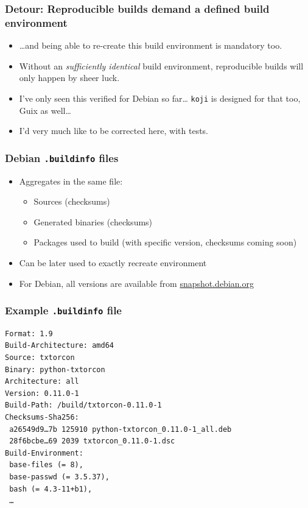 \documentclass[14pt,aspectratio=169]{beamer}
\begin{document}
\begin{frame}
 \frametitle{Detour: Reproducible builds demand a defined build environment}
 \begin{itemize}
  \item …and being able to re-create this build environment is mandatory too.
  \item Without an \textit{sufficiently identical} build environment, reproducible builds will only
  happen by sheer luck.
  \item<2>{I've only seen this verified for Debian so far… \texttt{koji}
  is designed for that too, Guix as well…}
\item<2> {I'd very much like to be corrected here, with tests.}
 \end{itemize}
\end{frame}


\begin{frame}
 \frametitle{Debian \texttt{.buildinfo} files}

 \begin{itemize}
  \item Aggregates in the same file:
   \begin{itemize}
    \item Sources (checksums)
    \item Generated binaries (checksums)
    \item Packages used to build (with specific version, checksums coming soon)
   \end{itemize}
  \item Can be later used to exactly recreate environment
  \item For Debian, all versions are available from \url{snapshot.debian.org}
 \end{itemize}
\end{frame}


\begin{frame}[fragile]
 \frametitle{Example \texttt{.buildinfo} file}

{\small
\begin{verbatim}
Format: 1.9
Build-Architecture: amd64
Source: txtorcon
Binary: python-txtorcon
Architecture: all
Version: 0.11.0-1
Build-Path: /build/txtorcon-0.11.0-1
Checksums-Sha256:
 a26549d9…7b 125910 python-txtorcon_0.11.0-1_all.deb
 28f6bcbe…69 2039 txtorcon_0.11.0-1.dsc
Build-Environment:
 base-files (= 8),
 base-passwd (= 3.5.37),
 bash (= 4.3-11+b1),
 …
\end{verbatim}
}
\end{frame}
\end{document}
